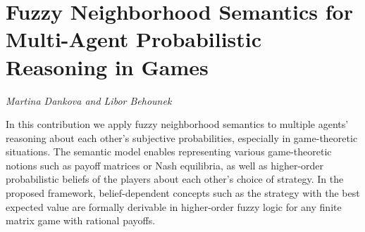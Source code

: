 \documentclass[../booklet.tex]{subfiles}
\begin{document}
\section[Fuzzy Neighborhood Semantics for Multi-Agent Probabilistic Reasoning in Games. {\it Martina Dankova and Libor Behounek}]{Fuzzy Neighborhood Semantics for Multi-Agent Probabilistic Reasoning in Games}
 

\begin{center}
  {\it Martina Dankova and Libor Behounek}
\end{center}

\vskip 0.8cm


In this contribution we apply fuzzy neighborhood semantics to multiple agents' reasoning about each other's subjective probabilities, especially in game-theoretic situations. The semantic model enables representing various game-theoretic notions such as payoff matrices or Nash equilibria, as well as higher-order probabilistic beliefs of the players about each other's choice of strategy. In the proposed framework, belief-dependent concepts such as the strategy with the best expected value are formally derivable in higher-order fuzzy logic for any finite matrix game with rational payoffs.

\end{document}
